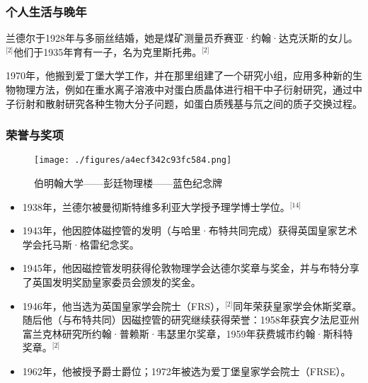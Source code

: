 \subsubsection{个人生活与晚年}
兰德尔于1928年与多丽丝结婚，她是煤矿测量员乔赛亚·约翰·达克沃斯的女儿。\(^\text{[2]}\)他们于1935年育有一子，名为克里斯托弗。\(^\text{[2]}\)

1970年，他搬到爱丁堡大学工作，并在那里组建了一个研究小组，应用多种新的生物物理方法，例如在重水离子溶液中对蛋白质晶体进行相干中子衍射研究，通过中子衍射和散射研究各种生物大分子问题，如蛋白质残基与氘之间的质子交换过程。
\subsubsection{荣誉与奖项}
\begin{figure}[ht]
\centering
\texttt{[image: ./figures/a4ecf342c93fc584.png]}
\caption{伯明翰大学——彭廷物理楼——蓝色纪念牌} \label{fig_YHldr_4}
\end{figure}
\begin{itemize}
\item 1938年，兰德尔被曼彻斯特维多利亚大学授予理学博士学位。\(^\text{[14]}\)
\item 1943年，他因腔体磁控管的发明（与哈里·布特共同完成）获得英国皇家艺术学会托马斯·格雷纪念奖。
\item 1945年，他因磁控管发明获得伦敦物理学会达德尔奖章与奖金，并与布特分享了英国发明奖励皇家委员会颁发的奖金。
\item 1946年，他当选为英国皇家学会院士（FRS），\(^\text{[2]}\)同年荣获皇家学会休斯奖章。
随后他（与布特共同）因磁控管的研究继续获得荣誉：1958年获宾夕法尼亚州富兰克林研究所约翰·普赖斯·韦瑟里尔奖章，1959年获费城市约翰·斯科特奖章。\(^\text{[2]}\)
\item 1962年，他被授予爵士爵位；1972年被选为爱丁堡皇家学会院士（FRSE）。
\end{itemize}
